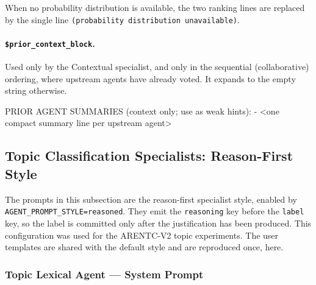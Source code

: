 \noindent
When no probability distribution is available, the two ranking lines are
replaced by the single line
\texttt{(probability distribution unavailable)}.

\paragraph{\texttt{\$prior\_context\_block}.}
Used only by the Contextual specialist, and only in the sequential
(collaborative) ordering, where upstream agents have already voted. It expands
to the empty string otherwise.

\begin{Prompt}
PRIOR AGENT SUMMARIES (context only; use as weak hints):
  - <one compact summary line per upstream agent>
\end{Prompt}


\subsection{Topic Classification Specialists: Reason-First Style}
\label{app:prompts:topic-specialists}

The prompts in this subsection are the reason-first specialist style, enabled
by \texttt{AGENT\_PROMPT\_STYLE=reasoned}. They emit the \texttt{reasoning} key
before the \texttt{label} key, so the label is committed only after the
justification has been produced. This configuration was used for the ARENTC-V2
topic experiments. The user templates are shared with the default style and are
reproduced once, here.

\subsubsection{Topic Lexical Agent --- System Prompt}

